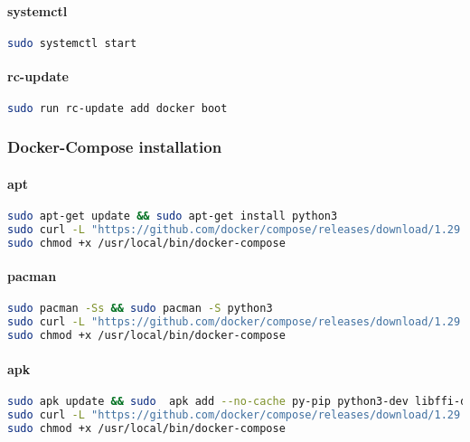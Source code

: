 \paragraph{systemctl}
\begin{lstlisting}[language=bash,label={lst:systemctl-docker}]
sudo systemctl start
\end{lstlisting}

\paragraph{rc-update}
\begin{flushleft}
\begin{lstlisting}[language=bash,label={lst:rc-docker}]
sudo run rc-update add docker boot
\end{lstlisting}
\end{flushleft}

\subsubsection{Docker-Compose installation}
\paragraph{apt}
\begin{flushleft}
\begin{lstlisting}[language=bash,label={lst:apt-compose}]
sudo apt-get update && sudo apt-get install python3
sudo curl -L "https://github.com/docker/compose/releases/download/1.29.2/docker-compose-$(uname -s)-$(uname -m)" -o /usr/local/bin/docker-compose
sudo chmod +x /usr/local/bin/docker-compose
\end{lstlisting}
\end{flushleft}

\paragraph{pacman}
\begin{flushleft}
\begin{lstlisting}[language=bash,label={lst:pacman-compose}]
sudo pacman -Ss && sudo pacman -S python3
sudo curl -L "https://github.com/docker/compose/releases/download/1.29.2/docker-compose-$(uname -s)-$(uname -m)" -o /usr/local/bin/docker-compose
sudo chmod +x /usr/local/bin/docker-compose
\end{lstlisting}
\end{flushleft}

\paragraph{apk}
\begin{flushleft}
\begin{lstlisting}[language=bash,label={lst:apk-compose}]
sudo apk update && sudo  apk add --no-cache py-pip python3-dev libffi-dev openssl-dev gcc libc-dev rust cargo make
sudo curl -L "https://github.com/docker/compose/releases/download/1.29.2/docker-compose-$(uname -s)-$(uname -m)" -o /usr/local/bin/docker-compose
sudo chmod +x /usr/local/bin/docker-compose
\end{lstlisting}
\end{flushleft}
